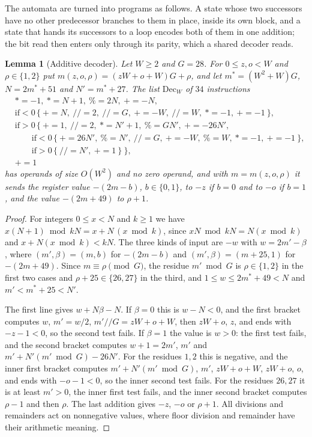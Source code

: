 \documentclass[11pt]{article}
\newtheorem{lemma}[theorem]{Lemma}
\theoremstyle{remark}
\begin{document}
The automata are turned into programs as follows.  A state whose two successors have
no other predecessor branches to them in place, inside its own block, and a state that
hands its successors to a loop encodes both of them in one addition; the bit read then
enters only through its parity, which a shared decoder reads.

\begin{lemma}[Additive decoder]\label{lem:adddec}
Let $W\ge2$ and $G=28$.  For $0\le z,o<W$ and $\rho\in\{1,2\}$ put
$m(z,o,\rho)=(zW+o+W)G+\rho$, and let $m^*=(W^2+W)G$, $N=2m^*+51$ and
$N'=m^*+27$.  The list $\mathrm{Dec}_W$ of $34$ instructions
\[
\begin{aligned}
 &\mathord{*}\!=-1,\ \mathord{*}\!=N+1,\ \mathord{\%}\!=2N,\ \mathord{+}\!=-N,\\
 &\text{if}<0\,\{\ \mathord{+}\!=N,\ /\!/\!=2,\ /\!/\!=G,\ \mathord{+}\!=-W,\
   /\!/\!=W,\ \mathord{*}\!=-1,\ \mathord{+}\!=-1\ \},\\
 &\text{if}>0\,\{\ \mathord{+}\!=1,\ /\!/\!=2,\ \mathord{*}\!=N'+1,\
   \mathord{\%}\!=GN',\ \mathord{+}\!=-26N',\\
 &\qquad\text{if}<0\,\{\ \mathord{+}\!=26N',\ \mathord{\%}\!=N',\ /\!/\!=G,\
   \mathord{+}\!=-W,\ \mathord{\%}\!=W,\ \mathord{*}\!=-1,\ \mathord{+}\!=-1\ \},\\
 &\qquad\text{if}>0\,\{\ /\!/\!=N',\ \mathord{+}\!=1\ \}\ \},\\
 &\mathord{+}\!=1
\end{aligned}
\]
has operands of size $O(W^2)$ and no zero operand, and with $m=m(z,o,\rho)$ it sends
the register value $-(2m-b)$, $b\in\{0,1\}$, to $-z$ if $b=0$ and to $-o$ if $b=1$, and
the value $-(2m+49)$ to $\rho+1$.
\end{lemma}

\begin{proof}
For integers $0\le x<N$ and $k\ge1$ we have $x(N+1)\bmod kN=x+N\,(x\bmod k)$, since
$xN\bmod kN=N(x\bmod k)$ and $x+N(x\bmod k)<kN$.  The three kinds of input are
$-w$ with $w=2m'-\beta$, where $(m',\beta)=(m,b)$ for $-(2m-b)$ and
$(m',\beta)=(m+25,1)$ for $-(2m+49)$.  Since $m\equiv\rho\pmod G$, the residue
$m'\bmod G$ is $\rho\in\{1,2\}$ in the first two cases and $\rho+25\in\{26,27\}$ in
the third, and $1\le w\le2m^*+49<N$ and $m'<m^*+25<N'$.

The first line gives $w+N\beta-N$.  If $\beta=0$ this is $w-N<0$, and the first
bracket computes $w$, $m'=w/2$, $m'/\!/G=zW+o+W$, then $zW+o$, $z$, and ends with
$-z-1<0$, so the second test fails.  If $\beta=1$ the value is $w>0$: the first test
fails, and the second bracket computes $w+1=2m'$, $m'$ and
$m'+N'(m'\bmod G)-26N'$.  For the residues $1,2$ this is negative, and the inner
first bracket computes $m'+N'(m'\bmod G)$, $m'$, $zW+o+W$, $zW+o$, $o$, and ends
with $-o-1<0$, so the inner second test fails.  For the residues $26,27$ it is at
least $m'>0$, the inner first test fails, and the inner second bracket computes
$\rho-1$ and then $\rho$.  The last addition gives $-z$, $-o$ or $\rho+1$.  All
divisions and remainders act on nonnegative values, where floor division and
remainder have their arithmetic meaning.
\end{proof}
\end{document}
